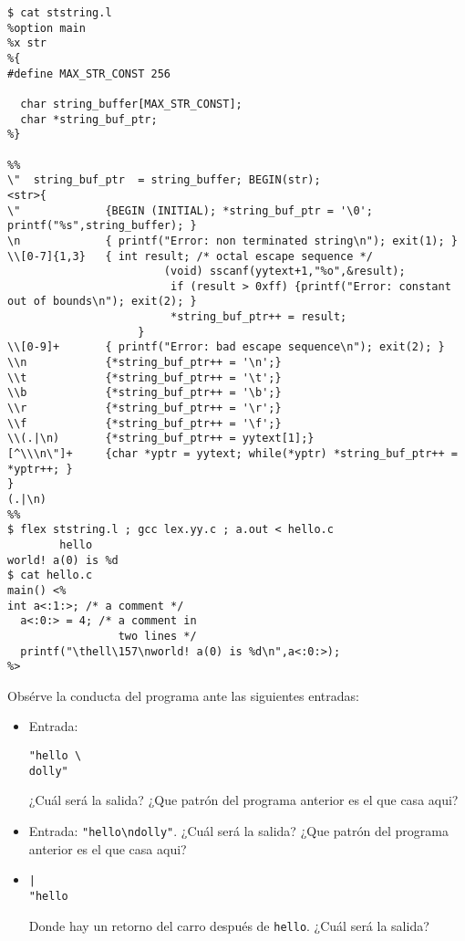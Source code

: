 \begin{verbatim}
$ cat ststring.l
%option main
%x str
%{
#define MAX_STR_CONST 256
 
  char string_buffer[MAX_STR_CONST];
  char *string_buf_ptr;
%}
 
%%
\"  string_buf_ptr  = string_buffer; BEGIN(str);
<str>{
\"             {BEGIN (INITIAL); *string_buf_ptr = '\0'; printf("%s",string_buffer); }
\n             { printf("Error: non terminated string\n"); exit(1); }
\\[0-7]{1,3}   { int result; /* octal escape sequence */
                        (void) sscanf(yytext+1,"%o",&result);
                         if (result > 0xff) {printf("Error: constant out of bounds\n"); exit(2); }
                         *string_buf_ptr++ = result;
                    }
\\[0-9]+       { printf("Error: bad escape sequence\n"); exit(2); }
\\n            {*string_buf_ptr++ = '\n';}
\\t            {*string_buf_ptr++ = '\t';}
\\b            {*string_buf_ptr++ = '\b';}
\\r            {*string_buf_ptr++ = '\r';}
\\f            {*string_buf_ptr++ = '\f';}
\\(.|\n)       {*string_buf_ptr++ = yytext[1];}
[^\\\n\"]+     {char *yptr = yytext; while(*yptr) *string_buf_ptr++ = *yptr++; }
}
(.|\n)
%%                            
$ flex ststring.l ; gcc lex.yy.c ; a.out < hello.c
        hello
world! a(0) is %d
$ cat hello.c
main() <%
int a<:1:>; /* a comment */
  a<:0:> = 4; /* a comment in
                 two lines */
  printf("\thell\157\nworld! a(0) is %d\n",a<:0:>);
%>                                   
\end{verbatim}
Obsérve la conducta del programa ante las siguientes entradas:
\begin{itemize}
\item
Entrada:
\begin{verbatim}
"hello \
dolly"
\end{verbatim}
¿Cuál será la salida? ¿Que patrón del programa anterior es el que casa aqui?
\item
Entrada:
\verb|"hello\ndolly"|.
¿Cuál será la salida? ¿Que patrón del programa anterior es el que casa aqui?
\item
\begin{verbatim}|
"hello

\end{verbatim}
Donde hay un retorno del carro después de \verb|hello|.
¿Cuál será la salida? %
\end{itemize}

